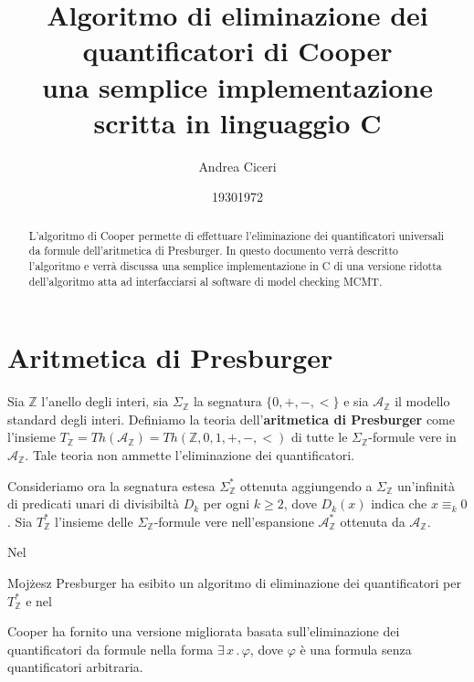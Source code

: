 \documentclass[11pt,letterpaper,twoside]{article}
\begin{document}
\newcommand{\src}[2]{\inputminted[linenos, mathescape=true, firstline={#1},
  lastline={#2}]{C}{../cooper.c}}
\newcommand{\inline}[1]{\texttt{#1}}

\title{%
  Algoritmo di eliminazione dei quantificatori di Cooper\\
  \large una semplice implementazione scritta in linguaggio C}
\author{Andrea Ciceri}
\maketitle

\begin{abstract}
  L'algoritmo di Cooper permette di effettuare l'eliminazione dei quantificatori
  universali da formule dell'aritmetica di Presburger. In questo documento
  verr\`a descritto l'algoritmo e verr\`a discussa una semplice implementazione
  in C di una versione ridotta dell'algoritmo atta ad interfacciarsi al
  software di model checking MCMT\autocite{mcmt}.  
\end{abstract}

\section{Aritmetica di Presburger}
Sia $\mathbb{Z}$ l'anello degli interi, sia $\Sigma_{\mathbb{Z}}$ la segnatura
$\{0, +, -, <\}$ e sia $\mathcal{A}_{\mathbb{Z}}$ il modello standard degli
interi.
Definiamo la teoria dell'\textbf{aritmetica di Presburger} come l'insieme
$T_{\mathbb{Z}}=Th(\mathcal{A}_{\mathbb{Z}})=Th(\mathbb{Z}, 0, 1, +, -, <)$ di
tutte le $\Sigma_{\mathbb{Z}}$-formule vere in $\mathcal{A}_{\mathbb{Z}}$.
Tale teoria non ammette l'eliminazione dei quantificatori.

Consideriamo ora la segnatura estesa $\Sigma_{\mathbb{Z}}^*$ ottenuta aggiungendo
a $\Sigma_{\mathbb{Z}}$ un'infinit\`a di predicati unari di divisibilt\`a $D_k$
per ogni $k \ge 2$, dove $D_k(x)$ indica che $x \equiv_k 0$.
Sia $T_{\mathbb{Z}}^*$ l'insieme delle $\Sigma_{\mathbb{Z}}$-formule vere
nell'espansione $\mathcal{A}_{\mathbb{Z}}^*$ ottenuta da
$\mathcal{A}_{\mathbb{Z}}$.

Nel \date{1930} Moj\.zesz Presburger ha esibito un algoritmo di eliminazione dei
quantificatori\autocite{presburger} per $T_{\mathbb{Z}}^*$ e nel \date{1972} Cooper ha fornito una
versione migliorata basata sull'eliminazione dei quantificatori da formule nella
forma $\exists \,x \,.\, \varphi$, dove $\varphi$ \`e una formula senza
quantificatori arbitraria.
\end{document}
